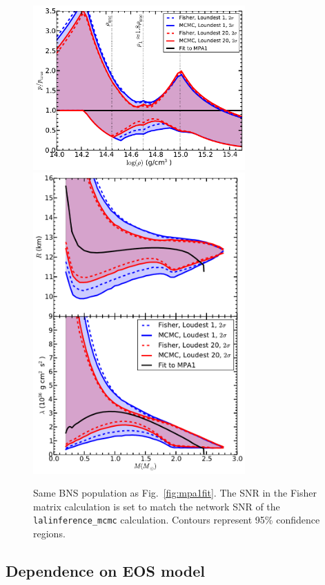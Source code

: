 \documentclass[twocolumn,prd,amssymb,aps,nofootinbib,showpacs,epsf]{revtex4}
\begin{document}
\begin{figure}[!htb]
\begin{center}
\includegraphics[width=3.2in]{CompareLALFisherZeroNoiseperror.pdf}\\
\includegraphics[width=3.2in]{CompareLALFisherZeroNoiseRadiuslambda.pdf}
\caption{Same BNS population as Fig.~\ref{fig:mpa1fit}. The SNR in the Fisher matrix calculation is set to match the network SNR of the \texttt{lalinference\_mcmc} calculation. Contours represent 95\% confidence regions.}
\label{fig:fisher}
\end{center}
\end{figure}


\subsection{Dependence on EOS model}
\end{document}
